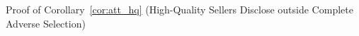Proof of Corollary~\ref{cor:att_hq} (High-Quality Sellers Disclose outside Complete Adverse Selection)
